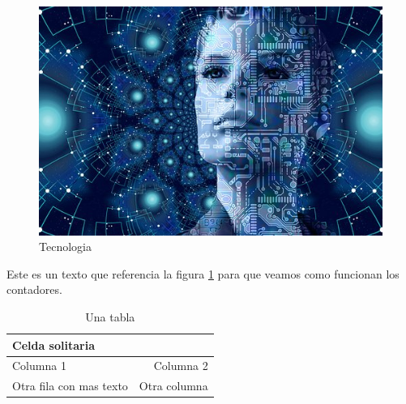 \documentclass[a4paper,12pt]{article}
\begin{document}

	\begin{figure}[h]
		\centering
		\includegraphics[]{tech1}
		\caption{Tecnologia}
		\label{fig:tecnologia}
	\end{figure}

	Este es un texto que referencia la figura \ref{fig:tecnologia} para que veamos como funcionan los contadores.

	\begin{table}[h]
		\centering
		\begin{tabular}{|l|r|}
			\hline
			Celda solitaria & \\
			\hline
			Columna 1 & Columna 2\\
			\hline
			Otra fila con mas texto & Otra columna\\
			\hline
		\end{tabular}
		\caption{Una tabla}
		\label{tab:una-tabla}	
	\end{table}
\end{document}
